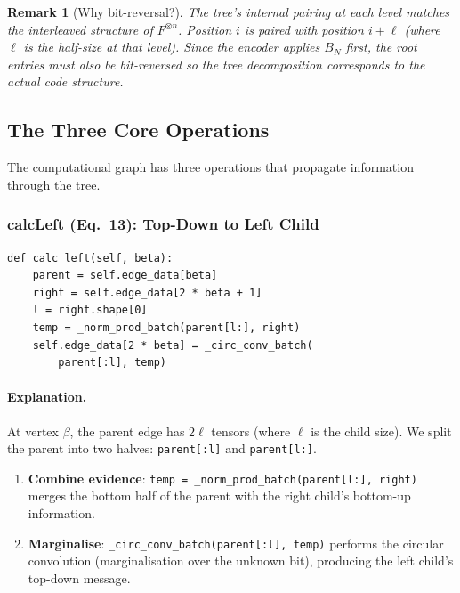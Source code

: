 \documentclass[11pt,a4paper]{article}
\newtheorem{remark}{Remark}[section]
\begin{document}
\begin{remark}[Why bit-reversal?]
The tree's internal pairing at each level matches the interleaved structure of $F^{\otimes n}$. Position $i$ is paired with position $i + \ell$ (where $\ell$ is the half-size at that level). Since the encoder applies $B_N$ first, the root entries must also be bit-reversed so the tree decomposition corresponds to the actual code structure.
\end{remark}

\subsection{The Three Core Operations}
\label{subsec:calc_ops}

The computational graph has three operations that propagate information through the tree.

\subsubsection{calcLeft (Eq.~13): Top-Down to Left Child}

\begin{lstlisting}[caption={calcLeft operation}]
def calc_left(self, beta):
    parent = self.edge_data[beta]
    right = self.edge_data[2 * beta + 1]
    l = right.shape[0]
    temp = _norm_prod_batch(parent[l:], right)
    self.edge_data[2 * beta] = _circ_conv_batch(
        parent[:l], temp)
\end{lstlisting}

\paragraph{Explanation.} At vertex $\beta$, the parent edge has $2\ell$ tensors (where $\ell$ is the child size). We split the parent into two halves: \texttt{parent[:l]} and \texttt{parent[l:]}.

\begin{enumerate}
    \item \textbf{Combine evidence}: \texttt{temp = \_norm\_prod\_batch(parent[l:], right)} merges the bottom half of the parent with the right child's bottom-up information.
    \item \textbf{Marginalise}: \texttt{\_circ\_conv\_batch(parent[:l], temp)} performs the circular convolution (marginalisation over the unknown bit), producing the left child's top-down message.
\end{enumerate}
\end{document}
